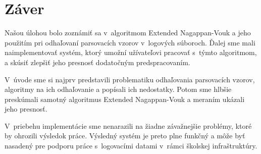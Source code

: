 \chapter*{Záver}
Našou úlohou bolo zoznámiť sa v~algoritmom Extended Nagappan-Vouk a jeho použitím pri odhaľovaní parsovacích vzorov v~logových súboroch. Ďalej sme mali naimplementovať systém, ktorý umožní užívateľovi pracovať s~týmto algoritmom, a skúsiť zlepšiť jeho presnosť dodatočným predspracovaním.
\par V~úvode sme si najprv predstavili problematiku odhaľovania parsovacích vzorov, algoritmy na ich odhaľovanie a popísali ich nedostatky. Potom sme hlbšie preskúmali samotný algoritmus Extended Nagappan-Vouk a meraním ukázali jeho presnosť. 
\par V~priebehu implementácie sme nenarazili na žiadne závažnejšie problémy, ktoré by ohrozili výsledok práce. Výsledný systém je preto plne funkčný a môže byť nasadený pre podporu práce s~logovacími datami v~rámci školskej infraštruktúry.